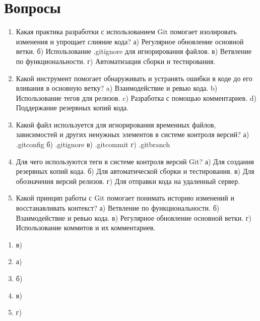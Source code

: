 \documentclass[letterpaper,10pt,russian]{sphinxmanual}
\begin{document}
\section{Вопросы}
\label{\detokenize{educational_materials/team_work_on_a_gitflic/quiz:id1}}\label{\detokenize{educational_materials/team_work_on_a_gitflic/quiz::doc}}\begin{enumerate}
%
\item {} 
\sphinxAtStartPar
Какая практика разработки с использованием Git помогает изолировать изменения и упрощает слияние кода?
а) Регулярное обновление основной ветки.
б) Использование .gitignore для игнорирования файлов.
в) Ветвление по функциональности.
г) Автоматизация сборки и тестирования.

\item {} 
\sphinxAtStartPar
Какой инструмент помогает обнаруживать и устранять ошибки в коде до его вливания в основную ветку?
a) Взаимодействие и ревью кода.
b) Использование тегов для релизов.
c) Разработка с помощью комментариев.
d) Поддержание резервных копий кода.

\item {} 
\sphinxAtStartPar
Какой файл используется для игнорирования временных файлов, зависимостей и других ненужных элементов в системе контроля версий?
а) .gitconfig
б) .gitignore
в) .gitcommit
г) .gitbranch

\item {} 
\sphinxAtStartPar
Для чего используются теги в системе контроля версий Git?
а) Для создания резервных копий кода.
б) Для автоматической сборки и тестирования.
в) Для обозначения версий релизов.
г) Для отправки кода на удаленный сервер.

\item {} 
\sphinxAtStartPar
Какой принцип работы с Git помогает понимать историю изменений и восстанавливать контекст?
а) Ветвление по функциональности.
б) Взаимодействие и ревью кода.
в) Регулярное обновление основной ветки.
г) Использование коммитов и их комментариев.

\end{enumerate}

\sphinxAtStartPar
{}
\begin{enumerate}
%
\item {} 
\sphinxAtStartPar
в)

\item {} 
\sphinxAtStartPar
а)

\item {} 
\sphinxAtStartPar
б)

\item {} 
\sphinxAtStartPar
в)

\item {} 
\sphinxAtStartPar
г)

\end{enumerate}
\end{document}
